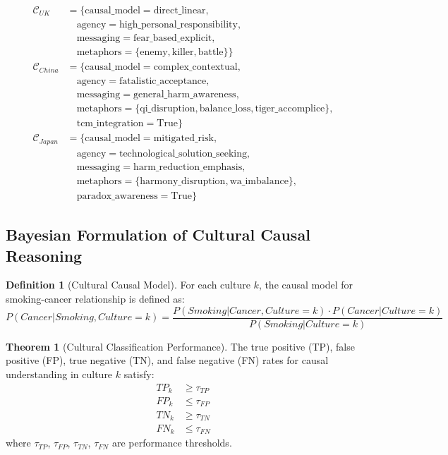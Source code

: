 \documentclass[11pt]{article}
\theoremstyle{definition}
\newtheorem{definition}{Definition}
\newtheorem{theorem}{Theorem}
\begin{document}
\begin{align}
\mathcal{C}_{UK} &= \{ \text{causal\_model} = \text{direct\_linear}, \\
&\quad \text{agency} = \text{high\_personal\_responsibility}, \\
&\quad \text{messaging} = \text{fear\_based\_explicit}, \\
&\quad \text{metaphors} = \{\text{enemy}, \text{killer}, \text{battle}\} \} \\
\mathcal{C}_{China} &= \{ \text{causal\_model} = \text{complex\_contextual}, \\
&\quad \text{agency} = \text{fatalistic\_acceptance}, \\
&\quad \text{messaging} = \text{general\_harm\_awareness}, \\
&\quad \text{metaphors} = \{\text{qi\_disruption}, \text{balance\_loss}, \text{tiger\_accomplice}\}, \\
&\quad \text{tcm\_integration} = \text{True} \} \\
\mathcal{C}_{Japan} &= \{ \text{causal\_model} = \text{mitigated\_risk}, \\
&\quad \text{agency} = \text{technological\_solution\_seeking}, \\
&\quad \text{messaging} = \text{harm\_reduction\_emphasis}, \\
&\quad \text{metaphors} = \{\text{harmony\_disruption}, \text{wa\_imbalance}\}, \\
&\quad \text{paradox\_awareness} = \text{True} \}
\end{align}

\subsection{Bayesian Formulation of Cultural Causal Reasoning}

\begin{definition}[Cultural Causal Model]
For each culture $k$, the causal model for smoking-cancer relationship is defined as:
\begin{equation}
P(Cancer|Smoking, Culture = k) = \frac{P(Smoking|Cancer, Culture = k) \cdot P(Cancer|Culture = k)}{P(Smoking|Culture = k)}
\end{equation}
\end{definition}

\begin{theorem}[Cultural Classification Performance]
The true positive (TP), false positive (FP), true negative (TN), and false negative (FN) rates for causal understanding in culture $k$ satisfy:
\begin{align}
TP_k &\geq \tau_{TP} \\
FP_k &\leq \tau_{FP} \\
TN_k &\geq \tau_{TN} \\
FN_k &\leq \tau_{FN}
\end{align}
where $\tau_{TP}$, $\tau_{FP}$, $\tau_{TN}$, $\tau_{FN}$ are performance thresholds.
\end{theorem}
\end{document}
